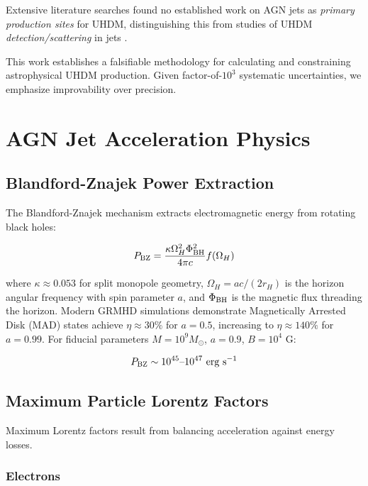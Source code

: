 \documentclass[twocolumn,superscriptaddress,prd,nofootinbib]{revtex4-2}
\begin{document}
Extensive literature searches found no established work on AGN jets as \emph{primary production sites} for UHDM, distinguishing this from studies of UHDM \emph{detection/scattering} in jets \citep{Gorchtein2010,Wang2024}.

This work establishes a falsifiable methodology for calculating and constraining astrophysical UHDM production. Given factor-of-$10^3$ systematic uncertainties, we emphasize improvability over precision.

\section{AGN Jet Acceleration Physics}
\label{sec:acceleration}

\subsection{Blandford-Znajek Power Extraction}

The Blandford-Znajek mechanism \citep{BlandfordZnajek1977} extracts electromagnetic energy from rotating black holes:

\begin{equation}
P_{\rm BZ} = \frac{\kappa \Omega_H^2 \Phi_{\rm BH}^2}{4\pi c} f(\Omega_H)
\label{eq:BZ_power}
\end{equation}

where $\kappa \approx 0.053$ for split monopole geometry, $\Omega_H = ac/(2r_H)$ is the horizon angular frequency with spin parameter $a$, and $\Phi_{\rm BH}$ is the magnetic flux threading the horizon. Modern GRMHD simulations \citep{Tchekhovskoy2010,McKinney2012} demonstrate Magnetically Arrested Disk (MAD) states achieve $\eta \approx 30\%$ for $a = 0.5$, increasing to $\eta \approx 140\%$ for $a = 0.99$. For fiducial parameters $M = 10^9 M_\odot$, $a = 0.9$, $B = 10^4$ G:

\begin{equation}
P_{\rm BZ} \sim 10^{45}\text{--}10^{47} \text{ erg s}^{-1}
\label{eq:BZ_fiducial}
\end{equation}

\subsection{Maximum Particle Lorentz Factors}

Maximum Lorentz factors result from balancing acceleration against energy losses.

\subsubsection{Electrons}
\end{document}
